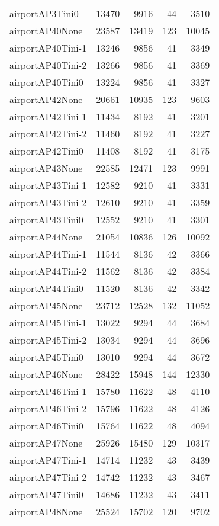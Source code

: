 \begin{longtable}{lrrrr}
airportAP3Tini0 & 13470 & 9916 & 44 & 3510 \\
airportAP40None & 23587 & 13419 & 123 & 10045 \\
airportAP40Tini-1 & 13246 & 9856 & 41 & 3349 \\
airportAP40Tini-2 & 13266 & 9856 & 41 & 3369 \\
airportAP40Tini0 & 13224 & 9856 & 41 & 3327 \\
airportAP42None & 20661 & 10935 & 123 & 9603 \\
airportAP42Tini-1 & 11434 & 8192 & 41 & 3201 \\
airportAP42Tini-2 & 11460 & 8192 & 41 & 3227 \\
airportAP42Tini0 & 11408 & 8192 & 41 & 3175 \\
airportAP43None & 22585 & 12471 & 123 & 9991 \\
airportAP43Tini-1 & 12582 & 9210 & 41 & 3331 \\
airportAP43Tini-2 & 12610 & 9210 & 41 & 3359 \\
airportAP43Tini0 & 12552 & 9210 & 41 & 3301 \\
airportAP44None & 21054 & 10836 & 126 & 10092 \\
airportAP44Tini-1 & 11544 & 8136 & 42 & 3366 \\
airportAP44Tini-2 & 11562 & 8136 & 42 & 3384 \\
airportAP44Tini0 & 11520 & 8136 & 42 & 3342 \\
airportAP45None & 23712 & 12528 & 132 & 11052 \\
airportAP45Tini-1 & 13022 & 9294 & 44 & 3684 \\
airportAP45Tini-2 & 13034 & 9294 & 44 & 3696 \\
airportAP45Tini0 & 13010 & 9294 & 44 & 3672 \\
airportAP46None & 28422 & 15948 & 144 & 12330 \\
airportAP46Tini-1 & 15780 & 11622 & 48 & 4110 \\
airportAP46Tini-2 & 15796 & 11622 & 48 & 4126 \\
airportAP46Tini0 & 15764 & 11622 & 48 & 4094 \\
airportAP47None & 25926 & 15480 & 129 & 10317 \\
airportAP47Tini-1 & 14714 & 11232 & 43 & 3439 \\
airportAP47Tini-2 & 14742 & 11232 & 43 & 3467 \\
airportAP47Tini0 & 14686 & 11232 & 43 & 3411 \\
airportAP48None & 25524 & 15702 & 120 & 9702 \\

\end{longtable}
